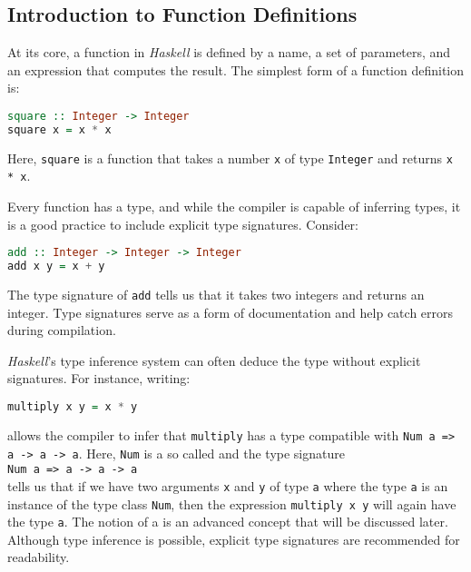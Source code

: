 \subsection{Introduction to Function Definitions}
At its core, a function in \textsl{Haskell} is defined by a name, a set of parameters, and an expression that computes the result. The simplest form of a function definition is:
\begin{lstlisting}[style=haskellstyle, language=Haskell]
square :: Integer -> Integer
square x = x * x
\end{lstlisting}
Here, \texttt{square} is a function that takes a number \texttt{x} of type \texttt{Integer} and returns
\texttt{x * x}. 

Every function has a type, and while the compiler is capable of inferring types, it is a good practice to include explicit type signatures. Consider:
\begin{lstlisting}[style=haskellstyle, language=Haskell]
add :: Integer -> Integer -> Integer
add x y = x + y
\end{lstlisting}
The type signature of \texttt{add} tells us that it takes two integers and returns an integer. Type signatures
serve as a form of documentation and help catch errors during compilation. 

\textsl{Haskell}’s type inference system can often deduce the type without explicit signatures. For instance, writing:
\begin{lstlisting}[style=haskellstyle, language=Haskell]
multiply x y = x * y
\end{lstlisting}
allows the compiler to infer that \texttt{multiply} has a type compatible with \texttt{Num a => a -> a -> a}.
Here, \texttt{Num} is a so called  and the type signature
\\[0.2cm]
\hspace*{1.3cm}
\texttt{Num a => a -> a -> a}
\\[0.2cm]
tells us that if we have two arguments \texttt{x} and \texttt{y} of type \texttt{a} where the type \texttt{a}
is an instance of the type class \texttt{Num}, then the expression \texttt{multiply x y} will again have the
type \texttt{a}.  The notion of a  is an advanced concept that will be discussed later. 
Although type inference is possible, explicit type signatures are recommended for readability.

